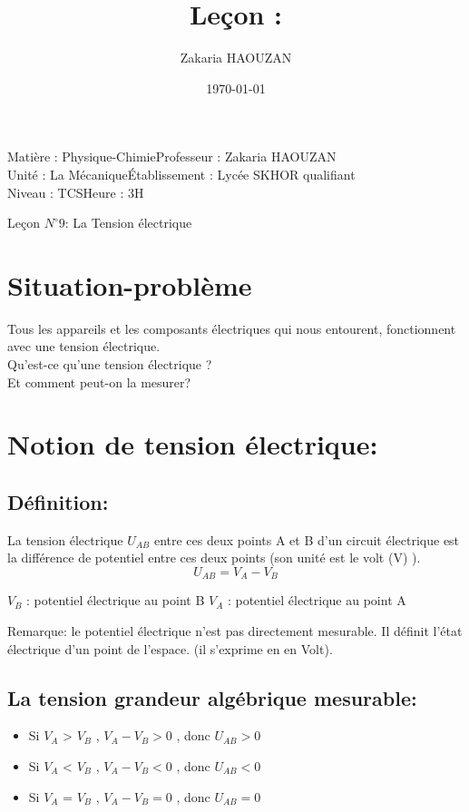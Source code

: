 \documentclass[12pt]{article}
\title{Leçon : }
\author{Zakaria HAOUZAN}
\date{\today}
\newcommand\headerMe[2]{\noindent{}#1\hfill#2}
\begin{document}
\headerMe{Matière : Physique-Chimie}{Professeur : Zakaria HAOUZAN}\\
\headerMe{Unité : La Mécanique}{Établissement : Lycée SKHOR qualifiant}\\
\headerMe{Niveau : TCS}{Heure : 3H}\\

\begin{center}
    \Large{Leçon $N^{\circ}9$: \color{red}La Tension électrique}
\end{center}

\section{Situation-problème}
Tous les appareils et les composants électriques qui nous entourent, fonctionnent avec une
tension électrique.
\\Qu’est-ce qu’une tension électrique ?
\\ Et comment peut-on la mesurer?

\section{Notion de tension électrique:}
\subsection{Définition:}
La tension électrique $U_{AB}$ entre ces deux points A et B d'un circuit électrique est la différence de potentiel entre ces deux points (son unité est le volt (V) ).
$$U_{AB} = V_A - V_B$$

$V_B$ : potentiel électrique au point B \hspace{1cm} $V_A$ : potentiel électrique au point A

Remarque: le potentiel électrique n'est pas directement mesurable. Il définit l'état électrique d'un point de l'espace. (il s'exprime en en Volt).

\subsection{La tension grandeur algébrique mesurable:}
\begin{itemize}
    \item Si $V_A$ > $V_B$ , $V_A - V_B > 0$ , donc $U_{AB} > 0$
    \item Si $V_A$ < $V_B$ , $V_A - V_B < 0$ , donc $U_{AB} < 0$
    \item Si $V_A$ = $V_B$ , $V_A - V_B = 0$ , donc $U_{AB} = 0$
\end{itemize}
\end{document}
